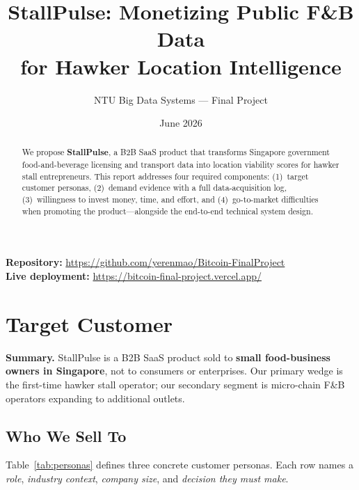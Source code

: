\documentclass[11pt,a4paper]{article}
\title{\textbf{StallPulse: Monetizing Public F\&B Data\\for Hawker Location Intelligence}}
\author{NTU Big Data Systems --- Final Project}
\date{June 2026}
\begin{document}
\maketitle

\begin{center}
  \vspace{-0.5em}
  \textbf{Repository:} \url{https://github.com/yerenmao/Bitcoin-FinalProject}\\[0.4em]
  \textbf{Live deployment:} \url{https://bitcoin-final-project.vercel.app/}
\end{center}

\vspace{1em}
\begin{abstract}
We propose \textbf{StallPulse}, a B2B SaaS product that transforms Singapore government food-and-beverage licensing and transport data into location viability scores for hawker stall entrepreneurs. This report addresses four required components: (1)~target customer personas, (2)~demand evidence with a full data-acquisition log, (3)~willingness to invest money, time, and effort, and (4)~go-to-market difficulties when promoting the product---alongside the end-to-end technical system design.
\end{abstract}

\tableofcontents
\newpage

\section{Target Customer}
\label{sec:customer}

\noindent\textbf{Summary.} StallPulse is a B2B SaaS product sold to \textbf{small food-business owners in Singapore}, not to consumers or enterprises. Our primary wedge is the first-time hawker stall operator; our secondary segment is micro-chain F\&B operators expanding to additional outlets.

\subsection{Who We Sell To}

Table~\ref{tab:personas} defines three concrete customer personas. Each row names a \textit{role}, \textit{industry context}, \textit{company size}, and \textit{decision they must make}.
\end{document}
